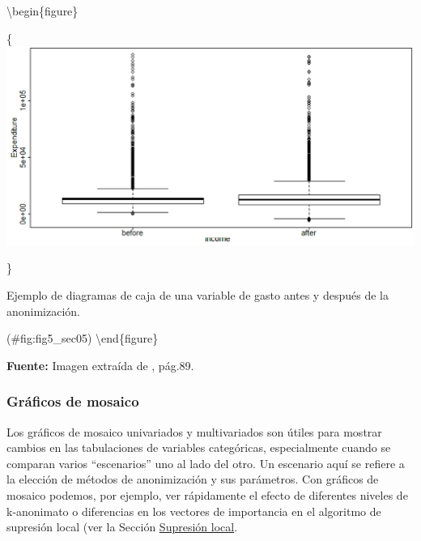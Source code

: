 \documentclass[]{book}
\newenvironment{Shaded}{\begin{snugshade}}{\end{snugshade}}
\newcommand{\DataTypeTok}[1]{\textcolor[rgb]{0.13,0.29,0.53}{#1}}
\newcommand{\DecValTok}[1]{\textcolor[rgb]{0.00,0.00,0.81}{#1}}
\newcommand{\KeywordTok}[1]{\textcolor[rgb]{0.13,0.29,0.53}{\textbf{#1}}}
\newcommand{\NormalTok}[1]{#1}
\newcommand{\OperatorTok}[1]{\textcolor[rgb]{0.81,0.36,0.00}{\textbf{#1}}}
\newcommand{\StringTok}[1]{\textcolor[rgb]{0.31,0.60,0.02}{#1}}
\theoremstyle{definition}
\theoremstyle{definition}
\theoremstyle{definition}
\theoremstyle{definition}
\theoremstyle{remark}
\begin{document}
\begin{Shaded}
\end{Shaded}

\textbackslash{}begin\{figure\}

\{\centering \includegraphics[width=0.9\linewidth]{Imagenes/fig5}

\}

\caption{Ejemplo de diagramas de caja de una variable de gasto antes y después de la anonimización.}

(\#fig:fig5\_sec05)
\textbackslash{}end\{figure\}

\textbf{Fuente:} Imagen extraída de \citep{benschop2021}, pág.89.

\hypertarget{gruxe1ficos-de-mosaico}{%
\subsubsection{Gráficos de mosaico}\label{gruxe1ficos-de-mosaico}}

Los gráficos de mosaico univariados y multivariados son útiles para mostrar cambios en las tabulaciones de variables categóricas, especialmente cuando se comparan varios ``escenarios'' uno al lado del otro. Un escenario aquí se refiere a la elección de métodos de anonimización y sus parámetros. Con gráficos de mosaico podemos, por
ejemplo, ver rápidamente el efecto de diferentes niveles de k-anonimato o diferencias en los vectores de importancia en el algoritmo de supresión local (ver la Sección \protect\hyperlink{sup-loc}{Supresión local}.
\end{document}
